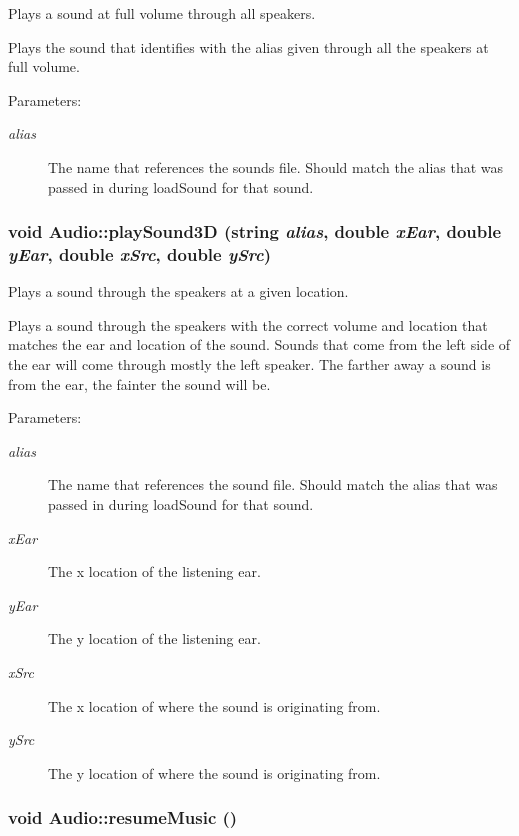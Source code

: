 Plays a sound at full volume through all speakers. 

Plays the sound that identifies with the alias given through all the speakers at full volume. \begin{Desc}
\item[Parameters:]
\begin{description}
\item[{\em alias}]The name that references the sounds file. Should match the alias that was passed in during loadSound for that sound. \end{description}
\end{Desc}
\hypertarget{class_audio_6d08aba180fb15e764d1c983c1fbba4c}{
\subsubsection[{playSound3D}]{\setlength{\rightskip}{0pt plus 5cm}void Audio::playSound3D (string {\em alias}, \/  double {\em xEar}, \/  double {\em yEar}, \/  double {\em xSrc}, \/  double {\em ySrc})}}
\label{class_audio_6d08aba180fb15e764d1c983c1fbba4c}


Plays a sound through the speakers at a given location. 

Plays a sound through the speakers with the correct volume and location that matches the ear and location of the sound. Sounds that come from the left side of the ear will come through mostly the left speaker. The farther away a sound is from the ear, the fainter the sound will be. \begin{Desc}
\item[Parameters:]
\begin{description}
\item[{\em alias}]The name that references the sound file. Should match the alias that was passed in during loadSound for that sound. \item[{\em xEar}]The x location of the listening ear. \item[{\em yEar}]The y location of the listening ear. \item[{\em xSrc}]The x location of where the sound is originating from. \item[{\em ySrc}]The y location of where the sound is originating from. \end{description}
\end{Desc}
\hypertarget{class_audio_0be741f8374145f05250c8adaaa2b0d9}{
\subsubsection[{resumeMusic}]{\setlength{\rightskip}{0pt plus 5cm}void Audio::resumeMusic ()}}
\label{class_audio_0be741f8374145f05250c8adaaa2b0d9}


